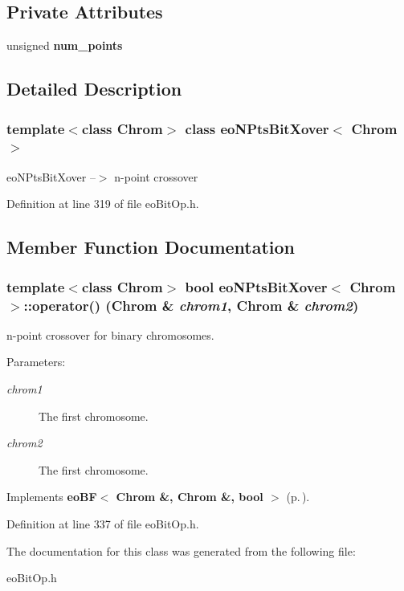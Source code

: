 \subsection*{Private Attributes}
\begin{CompactItemize}
\item 
unsigned {\bf num\_\-points}\label{classeo_n_pts_bit_xover_r0}

\end{CompactItemize}


\subsection{Detailed Description}
\subsubsection*{template$<$class Chrom$>$ class eo\-NPts\-Bit\-Xover$<$ Chrom $>$}

eo\-NPts\-Bit\-Xover --$>$ n-point crossover 



Definition at line 319 of file eo\-Bit\-Op.h.

\subsection{Member Function Documentation}
\subsubsection{\setlength{\rightskip}{0pt plus 5cm}template$<$class Chrom$>$ bool {\bf eo\-NPts\-Bit\-Xover}$<$ Chrom $>$::operator() (Chrom \& {\em chrom1}, Chrom \& {\em chrom2})\hspace{0.3cm}{\tt  [inline, virtual]}}\label{classeo_n_pts_bit_xover_a2}


n-point crossover for binary chromosomes. 

\begin{Desc}
\item[Parameters:]
\begin{description}
\item[{\em chrom1}]The first chromosome. \item[{\em chrom2}]The first chromosome. \end{description}
\end{Desc}


Implements {\bf eo\-BF$<$ Chrom \&, Chrom \&, bool $>$} {\rm (p.\,\pageref{classeo_b_f_a1})}.

Definition at line 337 of file eo\-Bit\-Op.h.

The documentation for this class was generated from the following file:\begin{CompactItemize}
\item 
eo\-Bit\-Op.h\end{CompactItemize}
